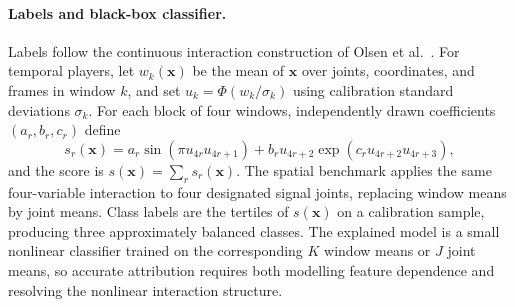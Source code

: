 \paragraph{Labels and black-box classifier.}
Labels follow the continuous interaction construction of Olsen et al.~\citep{olsen2022using}.  For temporal players, let $w_k(\mathbf{x})$ be the mean of $\mathbf{x}$ over joints, coordinates, and frames in window $k$, and set $u_k=\Phi(w_k/\sigma_k)$ using calibration standard deviations $\sigma_k$.  For each block of four windows, independently drawn coefficients $(a_r,b_r,c_r)$ define
\begin{equation}
  s_r(\mathbf{x})
  =
  a_r\sin(\pi u_{4r}u_{4r+1})
  +
  b_r u_{4r+2}\exp(c_r u_{4r+2}u_{4r+3}),
  \label{eq:olsen_score}
\end{equation}
and the score is $s(\mathbf{x})=\sum_r s_r(\mathbf{x})$.  The spatial benchmark applies the same four-variable interaction to four designated signal joints, replacing window means by joint means.  Class labels are the tertiles of $s(\mathbf{x})$ on a calibration sample, producing three approximately balanced classes.  The explained model is a small nonlinear classifier trained on the corresponding $K$ window means or $J$ joint means, so accurate attribution requires both modelling feature dependence and resolving the nonlinear interaction structure.